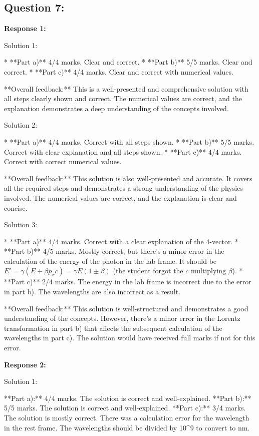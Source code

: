 \documentclass[a4paper,11pt]{article}
\begin{document}
\subsection*{Question 7:}

\textbf{Response 1:}

Solution 1:

* **Part a)** 4/4 marks. Clear and correct.
* **Part b)** 5/5 marks. Clear and correct.
* **Part c)** 4/4 marks. Clear and correct with numerical values.

**Overall feedback:** This is a well-presented and comprehensive solution with all steps clearly shown and correct. The numerical values are correct, and the explanation demonstrates a deep understanding of the concepts involved.

Solution 2:

* **Part a)** 4/4 marks. Correct with all steps shown.
* **Part b)** 5/5 marks. Correct with clear explanation and all steps shown.
* **Part c)** 4/4 marks. Correct with correct numerical values.

**Overall feedback:** This solution is also well-presented and accurate. It covers all the required steps and demonstrates a strong understanding of the physics involved. The numerical values are correct, and the explanation is clear and concise.

Solution 3:

* **Part a)** 4/4 marks. Correct with a clear explanation of the 4-vector.
* **Part b)** 4/5 marks. Mostly correct, but there's a minor error in the calculation of the energy of the photon in the lab frame. It should be \(E' = \gamma(E + \beta p_x c) = \gamma E (1 \pm \beta)\) (the student forgot the \(c\) multiplying \(\beta\)).
* **Part c)** 2/4 marks. The energy in the lab frame is incorrect due to the error in part b). The wavelengths are also incorrect as a result.

**Overall feedback:** This solution is well-structured and demonstrates a good understanding of the concepts. However, there's a minor error in the Lorentz transformation in part b) that affects the subsequent calculation of the wavelengths in part c). The solution would have received full marks if not for this error.

\bigskip    
\textbf{Response 2:}

Solution 1:

**Part a):** 4/4 marks. The solution is correct and well-explained.
**Part b):** 5/5 marks. The solution is correct and well-explained.
**Part c):** 3/4 marks. The solution is mostly correct. There was a calculation error for the wavelength in the rest frame. The wavelengths should be divided by 10^9 to convert to nm. 
\end{document}
